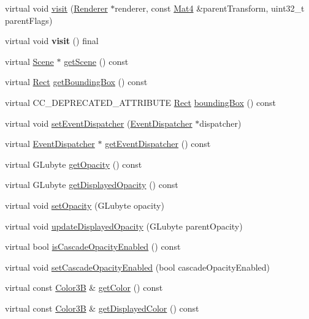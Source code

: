 \begin{DoxyCompactItemize}
virtual void \hyperlink{classNode_a76252604e0e9e0f8a8830c97993133f4}{visit} (\hyperlink{classRenderer}{Renderer} $\ast$renderer, const \hyperlink{classMat4}{Mat4} \&parent\+Transform, uint32\+\_\+t parent\+Flags)
\item 
\mbox{\label{classNode_a826b7591e66c7bbf344e0bfd6d8ea5ed}} 
virtual void {\bfseries visit} () final
\item 
virtual \hyperlink{classScene}{Scene} $\ast$ \hyperlink{classNode_adab0150253ebac47b36dfcdf8f8f8696}{get\+Scene} () const
\item 
virtual \hyperlink{classRect}{Rect} \hyperlink{classNode_a18d421a217968b87898b7a7382ff7e1b}{get\+Bounding\+Box} () const
\item 
virtual C\+C\+\_\+\+D\+E\+P\+R\+E\+C\+A\+T\+E\+D\+\_\+\+A\+T\+T\+R\+I\+B\+U\+TE \hyperlink{classRect}{Rect} \hyperlink{classNode_a7744d16609dfc7609e889129b8672afb}{bounding\+Box} () const
\item 
virtual void \hyperlink{classNode_a07c33fba3541a982e253f9d6c908daaa}{set\+Event\+Dispatcher} (\hyperlink{classEventDispatcher}{Event\+Dispatcher} $\ast$dispatcher)
\item 
virtual \hyperlink{classEventDispatcher}{Event\+Dispatcher} $\ast$ \hyperlink{classNode_ae6ba7b287241f031b271d7d680f070f3}{get\+Event\+Dispatcher} () const
\item 
virtual G\+Lubyte \hyperlink{classNode_a46206e9eb52b57c070446613659fe310}{get\+Opacity} () const
\item 
virtual G\+Lubyte \hyperlink{classNode_a81bba31d0e8774ac3fe5c517bfe86e97}{get\+Displayed\+Opacity} () const
\item 
virtual void \hyperlink{classNode_add84cdfdadeb8862c2149a57a565017c}{set\+Opacity} (G\+Lubyte opacity)
\item 
virtual void \hyperlink{classNode_aed685e5e2976c1387525aae96f39f4f5}{update\+Displayed\+Opacity} (G\+Lubyte parent\+Opacity)
\item 
virtual bool \hyperlink{classNode_a9d78071b3146583829431d79ffc6ae08}{is\+Cascade\+Opacity\+Enabled} () const
\item 
virtual void \hyperlink{classNode_a9e36b274a6ee75f4931611b4c53f6180}{set\+Cascade\+Opacity\+Enabled} (bool cascade\+Opacity\+Enabled)
\item 
virtual const \hyperlink{structColor3B}{Color3B} \& \hyperlink{classNode_af9507fbd163ea92784f52f4cd15c000d}{get\+Color} () const
\item 
virtual const \hyperlink{structColor3B}{Color3B} \& \hyperlink{classNode_a1285caec57206ce980b727b86e1976f7}{get\+Displayed\+Color} () const

\end{DoxyCompactItemize}
